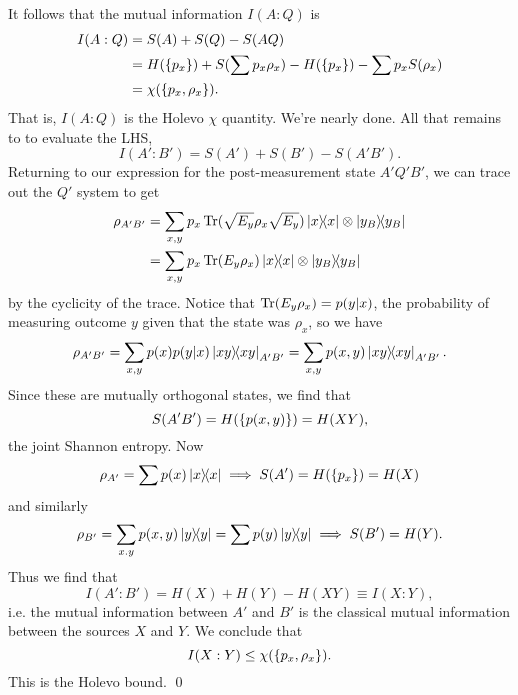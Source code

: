 It follows that the mutual information $I(A:Q)$ is
\begin{align*}
    I(A:Q) &= S(A) + S(Q) -S(AQ)\\
    &= H(\{p_x\}) + S(\sum p_x \rho_x) - H(\{p_x\}) -\sum p_x S(\rho_x)\\
    &= \chi(\{p_x,\rho_x\}).
\end{align*}
That is, $I(A:Q)$ is the Holevo $\chi$ quantity. We're nearly done. All that remains to to evaluate the LHS,
\begin{equation}
    I(A':B')=S(A')+S(B')-S(A'B').
\end{equation}
Returning to our expression for the post-measurement state $A'Q'B'$, we can trace out the $Q'$ system to get
\begin{align}
    \rho_{A'B'}&=\sum_{x,y} p_x \operatorname{Tr}(\sqrt{E_y} \rho_x\sqrt{E_y}) \left\lvert{x}\middle\rangle\!\middle\langle{x}\right\rvert \otimes \left\lvert{y_B}\middle\rangle\!\middle\langle{y_B}\right\rvert\\
        &=\sum_{x,y} p_x \operatorname{Tr}(E_y \rho_x) \left\lvert{x}\middle\rangle\!\middle\langle{x}\right\rvert \otimes \left\lvert{y_B}\middle\rangle\!\middle\langle{y_B}\right\rvert
\end{align}
by the cyclicity of the trace. Notice that $\operatorname{Tr}(E_y \rho_x) = p(y|x)$, the probability of measuring outcome $y$ given that the state was $\rho_x$, so we have
\begin{equation}
    \rho_{A'B'}= \sum_{x,y} p(x) p(y|x) \left\lvert{xy}\middle\rangle\!\middle\langle{xy}\right\rvert_{A'B'} = \sum_{x,y} p(x,y) \left\lvert{xy}\middle\rangle\!\middle\langle{xy}\right\rvert_{A'B'}.
\end{equation}
Since these are mutually orthogonal states, we find that
\begin{equation}
    S(A'B')=H(\{p(x,y)\}) = H(XY),
\end{equation}
the joint Shannon entropy. Now
\begin{equation}
    \rho_{A'}=\sum p(x) \left\lvert{x}\middle\rangle\!\middle\langle{x}\right\rvert \implies S(A')= H(\{p_x\})=H(X)
\end{equation}
and similarly
\begin{equation}
    \rho_{B'}=\sum_{x.y} p(x,y)\left\lvert{y}\middle\rangle\!\middle\langle{y}\right\rvert = \sum p(y) \left\lvert{y}\middle\rangle\!\middle\langle{y}\right\rvert \implies S(B')=H(Y).
\end{equation}
Thus we find that
\begin{equation}
    I(A':B')=H(X)+H(Y)-H(XY)\equiv I(X:Y),
\end{equation}
i.e. the mutual information between $A'$ and $B'$ is the classical mutual information between the sources $X$ and $Y$. We conclude that
\begin{equation}
    I(X:Y) \leq \chi(\{p_x,\rho_x\}). 
\end{equation}
This is the Holevo bound. \qed

